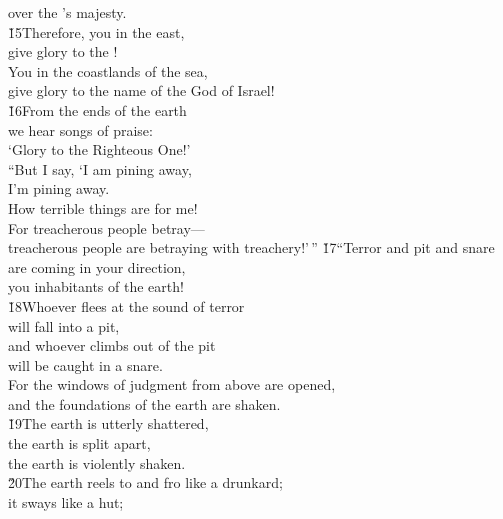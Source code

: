 \begin{poetry}
\poemll    over the 's majesty. \\
\poeml \v{15}Therefore, you in the east, \\
\poemll    give glory to the ! \\
\poeml You in the coastlands of the sea, \\
\poemll    give glory to the name of the  God of Israel! \\
\poeml \v{16}From the ends of the earth \\
\poemll    we hear songs of praise: \\
\poemlll       `Glory to the Righteous One!' \\
\poeml ``But I say, `I am pining away, \\
\poemll    I'm pining away. \\
\poemlll       How terrible things are for me! \\
\poeml For treacherous people betray--- \\
\poemll    treacherous people are betraying with treachery!'\,''
\poeml \v{17}``Terror and pit and snare are coming in your direction, \\
\poemll    you inhabitants of the earth! \\
\poeml \v{18}Whoever flees at the sound of terror \\
\poemll    will fall into a pit, \\
\poeml and whoever climbs out of the pit \\
\poemll    will be caught in a snare. \\
\poeml For the windows of judgment from above are opened, \\
\poemll    and the foundations of the earth are shaken. \\
\poeml \v{19}The earth is utterly shattered, \\
\poemll    the earth is split apart, \\
\poemlll       the earth is violently shaken. \\
\poeml \v{20}The earth reels to and fro like a drunkard; \\
\poemll    it sways like a hut; \\

\end{poetry}
